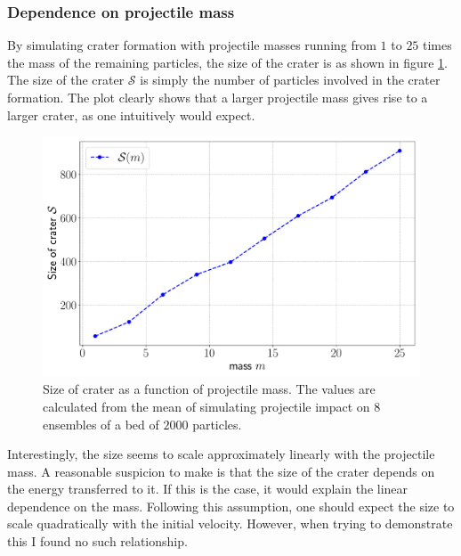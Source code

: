 \subsubsection{Dependence on projectile mass}

By simulating crater formation with projectile masses running from $1$ to $25$ times the mass of the remaining particles, the size of the crater is as shown in figure \ref{fig:mass_size}. The size of the crater $\mathcal{S}$ is simply the number of particles involved in the crater formation. The plot clearly shows that a larger projectile mass gives rise to a larger crater, as one intuitively would expect. 

\begin{figure}
	\centering
	\includegraphics[width=\columnwidth]{../fig/mass_size}
	\caption{Size of crater as a function of projectile mass. The values are calculated from the mean of simulating projectile impact on $8$ ensembles of a bed of $2000$ particles.}
	\label{fig:mass_size}
\end{figure}

Interestingly, the size seems to scale approximately linearly with the projectile mass. A reasonable suspicion to make is that the size of the crater depends on the energy transferred to it. If this is the case, it would explain the linear dependence on the mass. Following this assumption, one should expect the size to scale quadratically with the initial velocity. However, when trying to demonstrate this I found no such relationship. 
%
%


